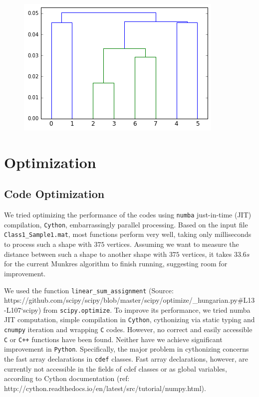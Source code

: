 \documentclass[11pt]{amsart}
\begin{document}
\begin{figure}
\includegraphics[width = \textwidth]{real_dendogram.png}
\end{figure}

\section{Optimization}
\subsection{Code Optimization}
We tried optimizing the performance of the codes using \texttt{numba} just-in-time (JIT) compilation, \texttt{Cython}, embarrassingly parallel processing. Based on the input file \texttt{Class1\_Sample1.mat}, most functions perform very well, taking only milliseconds to process such a shape with $375$ vertices. Assuming we want to measure the distance between such a shape to another shape with $375$ vertices, it takes $33.6s$ for the current Munkres algorithm to finish running, suggesting room for improvement.

We used the function \texttt{linear\_sum\_assignment} (Source: https://github.com/scipy/scipy/blob/master/scipy/optimize/\_hungarian.py\#L13-L107`scipy) from \texttt{scipy.optimize}. To improve its performance, we tried numba JIT computation, simple compilation in \texttt{Cython}, cythonizing via static typing and \texttt{cnumpy} iteration and wrapping \texttt{C} codes. However, no correct and easily accessible \texttt{C} or \texttt{C++} functions have been found. Neither have we achieve significant improvement in \texttt{Python}. Specifically, the major problem in cythonizing concerns the fast array declarations in \texttt{cdef} classes. Fast array declarations, however, are currently not accessible in the fields of cdef classes or as global variables, according to Cython documentation
(ref: http://cython.readthedocs.io/en/latest/src/tutorial/numpy.html).
\end{document}
